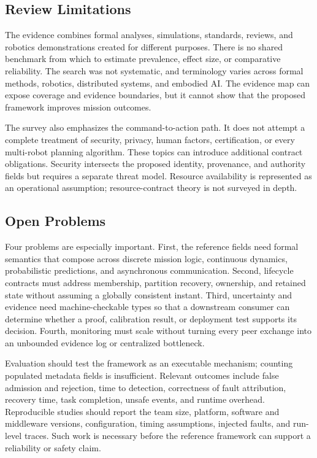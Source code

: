 \subsection{Review Limitations}

The evidence combines formal analyses, simulations, standards, reviews, and
robotics demonstrations created for different purposes.  There is no shared
benchmark from which to estimate prevalence, effect size, or comparative
reliability.  The search was not systematic, and terminology
varies across formal methods, robotics, distributed systems, and embodied AI.
The evidence map can expose coverage and evidence boundaries, but it cannot show
that the proposed framework improves mission outcomes.

The survey also emphasizes the command-to-action path.  It does not attempt a
complete treatment of security, privacy, human factors, certification, or every
multi-robot planning algorithm.  These topics can introduce additional contract
obligations.  Security intersects the proposed identity, provenance, and
authority fields but requires a separate threat model.  Resource availability
is represented as an operational assumption; resource-contract theory is not
surveyed in depth.

\subsection{Open Problems}

Four problems are especially important.  First, the reference fields need
formal semantics that compose across discrete mission logic, continuous
dynamics, probabilistic predictions, and asynchronous communication.  Second,
lifecycle contracts must address membership, partition recovery, ownership, and
retained state without assuming a globally consistent instant.  Third,
uncertainty and evidence need machine-checkable types so that a downstream
consumer can determine whether a proof, calibration result, or deployment test
supports its decision.  Fourth, monitoring must scale without turning every
peer exchange into an unbounded evidence log or centralized bottleneck.

Evaluation should test the framework as an executable mechanism; counting
populated metadata fields is insufficient.  Relevant outcomes include false
admission and rejection, time to detection, correctness of fault attribution, recovery
time, task completion, unsafe events, and runtime overhead.  Reproducible studies
should report the team size, platform, software and middleware versions,
configuration, timing assumptions, injected faults, and run-level traces.  Such
work is necessary before the reference framework can support a reliability or
safety claim.
